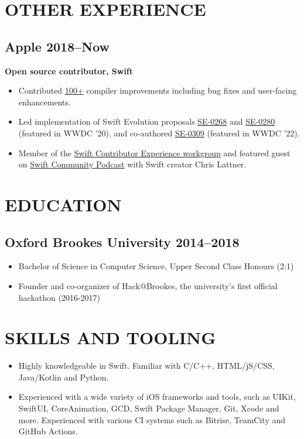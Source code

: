 \documentclass[11pt,a4paper]{article}
\begin{document}
\section*{OTHER EXPERIENCE}
\subsection*{Apple \hfill 2018--Now}
\textbf{Open source contributor, Swift}
\begin{itemize}[leftmargin=*]
\item Contributed \href{https://github.com/swiftlang/swift/pulls?q=is:pr+author:theblixguy+is:closed}{100+} compiler improvements including bug fixes and user-facing enhancements.
\item Led implementation of Swift Evolution proposals \href{https://github.com/swiftlang/swift-evolution/blob/main/proposals/0268-didset-semantics.md}{SE-0268} and \href{https://github.com/swiftlang/swift-evolution/blob/main/proposals/0280-enum-cases-as-protocol-witnesses.md}{SE-0280} (featured in WWDC '20), and co-authored \href{https://github.com/swiftlang/swift-evolution/blob/main/proposals/0309-unlock-existential-types-for-all-protocols.md}{SE-0309} (featured in WWDC '22).
\item Member of the \href{https://www.swift.org/contributor-experience-workgroup/}{Swift Contributor Experience workgroup} and featured guest on \href{https://www.swiftcommunitypodcast.org/}{Swift Community Podcast} with Swift creator Chris Lattner.
\end{itemize}

\section*{EDUCATION}
\subsection*{Oxford Brookes University \hfill 2014--2018}
\begin{itemize}[leftmargin=*]
\item Bachelor of Science in Computer Science, Upper Second Class Honours (2:1)
\item Founder and co-organizer of Hack@Brookes, the university's first official hackathon (2016-2017)
\end{itemize}

\section*{SKILLS AND TOOLING}
\begin{itemize}[leftmargin=*]
\item Highly knowledgeable in Swift. Familiar with C/C++, HTML/jS/CSS, Java/Kotlin and Python.
\item Experienced with a wide variety of iOS frameworks and tools, such as UIKit, SwiftUI, CoreAnimation, GCD, Swift Package Manager, Git, Xcode and more. Experienced with various CI systems such as Bitrise, TeamCity and GitHub Actions.
\end{itemize}
\end{document}
